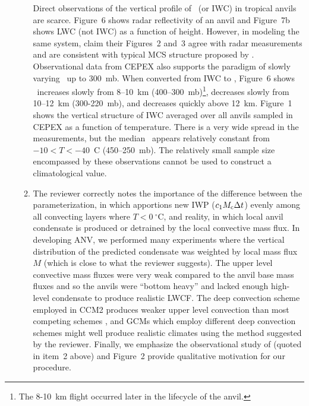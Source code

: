 \documentclass[12pt,twoside]{article}
\begin{document}
\begin{enumerate}
\begin{enumerate}
Direct observations of the vertical profile of \qi\ (or IWC) in
tropical anvils are scarce.
\cite{WSS931} Figure~6 shows radar reflectivity of an anvil and
Figure~7b shows LWC (not IWC) as a function of height. 
However, in modeling the same system, \cite{WSS932} claim their
Figures~2 and~3 agree with radar measurements and are consistent with
typical MCS structure proposed by \cite{Hou89}.  
Observational data from CEPEX also supports the paradigm of slowly
varying \qi\ up to 300~mb.
When converted from IWC to \qi, \cite{McH96} Figure~6 shows \qi\
increases slowly from 8--10~km (400--300~mb)\footnote{The 8-10~km
flight occurred later in the lifecycle of the anvil.}, decreases
slowly from 10--12~km (300-220~mb), and decreases quickly above
12~km. 
\cite{McH971} Figure~1 shows the vertical structure of IWC averaged
over all anvils sampled in CEPEX as a function of temperature. 
There is a very wide spread in the measurements, but the median \qi\
appears relatively constant from $-10 < T < -40$~C (450--250~mb). 
The relatively small sample size encompassed by these observations
cannot be used to construct a climatological value. 

\item The reviewer correctly notes the importance of the difference 
between the parameterization, in which apportions new IWP
($c_1\mbox{$M_\mathrm{c}$}\Delta t$) evenly among all convecting layers where $T <
0~^\circ$C, and reality, in which local anvil condensate is 
produced or detrained by the local convective mass flux.
In developing ANV, we performed many experiments where the vertical
distribution of the predicted condensate was weighted by local mass
flux $M$ (which is close to what the reviewer suggests). 
The upper level convective mass fluxes were very weak compared to the
anvil base mass fluxes and so the anvils were ``bottom heavy'' and
lacked enough high-level condensate to produce realistic LWCF. 
The deep convection scheme employed in CCM2 produces weaker upper
level convection than most competing schemes \cite[]{Hac94,MRP95}, and
GCMs which employ different deep convection schemes might well produce
realistic climates using the method suggested by the reviewer. 
Finally, we emphasize the observational study of \cite{MaR93} (quoted
in item~2 above) and Figure~2 provide qualitative motivation for our
procedure. 



\end{enumerate}
\end{enumerate}
\end{document}
